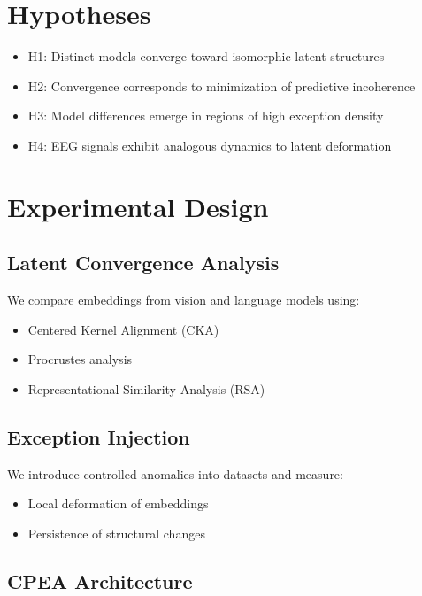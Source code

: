 \documentclass[11pt]{article}
\begin{document}
\section{Hypotheses}

\begin{itemize}
    \item H1: Distinct models converge toward isomorphic latent structures
    \item H2: Convergence corresponds to minimization of predictive incoherence
    \item H3: Model differences emerge in regions of high exception density
    \item H4: EEG signals exhibit analogous dynamics to latent deformation
\end{itemize}

\section{Experimental Design}

\subsection{Latent Convergence Analysis}

We compare embeddings from vision and language models using:

\begin{itemize}
    \item Centered Kernel Alignment (CKA)
    \item Procrustes analysis
    \item Representational Similarity Analysis (RSA)
\end{itemize}

\subsection{Exception Injection}

We introduce controlled anomalies into datasets and measure:

\begin{itemize}
    \item Local deformation of embeddings
    \item Persistence of structural changes
\end{itemize}

\subsection{CPEA Architecture}
\end{document}
